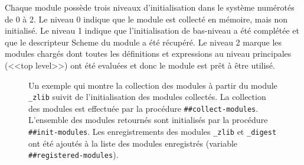 
Chaque module possède trois niveaux d'initialisation dans le système numérotés
de 0 à 2. Le niveau 0 indique que le module est collecté en mémoire, mais non
initialisé. Le niveau 1 indique que l'initialisation de bas-niveau a été
complétée et que le descripteur Scheme du module a été récupéré. Le niveau 2
marque les modules chargés dont toutes les définitions  et expressions au
niveau  principales (<<top level>>) ont été evaluées et donc le module est prêt
à être utilisé.  \\

\begin{figure}[h]
  \caption{Un exemple qui montre la collection des modules à partir du module
    \texttt{\_zlib} suivit de l'initialisation des modules collectés. La collection
    des modules est effectuée par la procédure \texttt{\#\#collect-modules}. L'ensemble
    des modules retournés sont initialisés par la procédure \texttt{\#\#init-modules}.
    Les enregistrements des modules \texttt{\_zlib} et \texttt{\_digest} ont été ajoutés
    à la liste des modules enregistrés (variable \texttt{\#\#registered-modules}).}
\end{figure}

